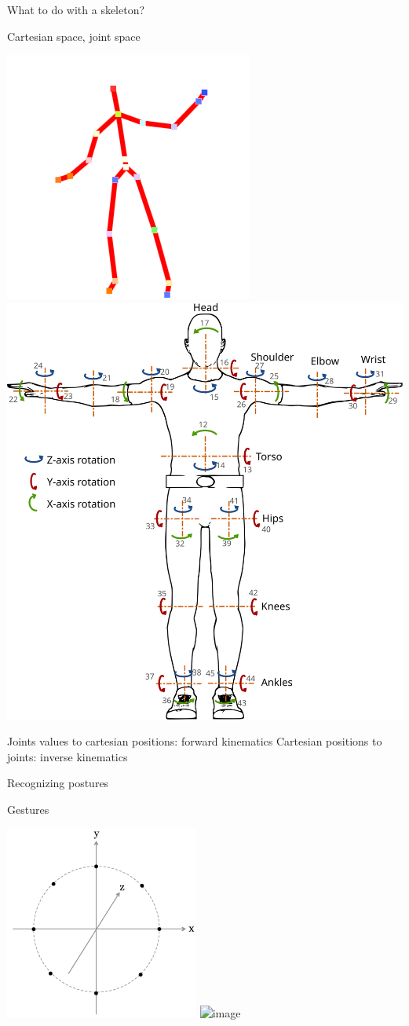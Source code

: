 \documentclass[compress]{beamer}
\begin{document}
\begin{frame}{}
    \centering
    What to do with a skeleton?
\end{frame}

\begin{frame}{Cartesian space, joint space}
    \begin{center}
        \includegraphics[width=0.45\linewidth]{skeleton/skeleton}
        \includegraphics[width=0.45\linewidth]{human_joints}

        Joints values to cartesian positions: {\Medium forward kinematics}
        Cartesian positions to joints: {\Medium inverse kinematics}
    \end{center}
\end{frame}


\begin{frame}{Recognizing postures}
\end{frame}


{
\begin{frame}{Gestures}
    \begin{center}
        \includegraphics[width=0.5\linewidth]{gesture-ideal}
        \includegraphics<2>[width=0.5\linewidth]{gesture-real}
    \end{center}
\end{frame}
}
\end{document}
